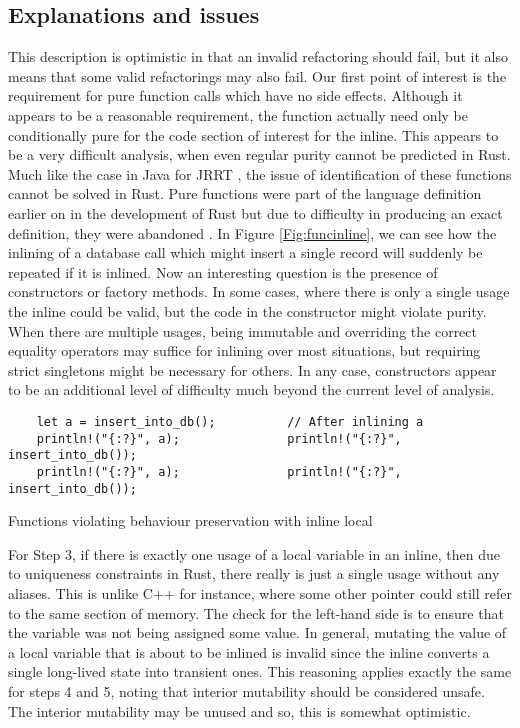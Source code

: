 \subsection{Explanations and issues}\label{S:inlineissues}
This description is optimistic in that an invalid refactoring should fail, but it also means that some valid refactorings may also fail. Our first point of interest is the requirement for pure function calls which have no side effects. Although it appears to be a reasonable requirement, the function actually need only be conditionally pure for the code section of interest for the inline. This appears to be a very difficult analysis, when even regular purity cannot be predicted in Rust. Much like the case in Java for JRRT \cite{schafer2010specification}, the issue of identification of these functions cannot be solved in Rust. Pure functions were part of the language definition earlier on in the development of Rust but due to difficulty in producing an exact definition, they were abandoned \cite{pwalton}. In Figure \ref{Fig:funcinline}, we can see how the inlining of a database call which might insert a single record will suddenly be repeated if it is inlined. Now an interesting question is the presence of constructors or factory methods. In some cases, where there is only a single usage the inline could be valid, but the code in the constructor might violate purity. When there are multiple usages, being immutable and overriding the correct equality operators may suffice for inlining over most situations, but requiring strict singletons might be necessary for others. In any case, constructors appear to be an additional level of difficulty much beyond the current level of analysis.

\begin{fig}[H]
\begin{verbatim}
    let a = insert_into_db();          // After inlining a
    println!("{:?}", a);               println!("{:?}", insert_into_db());
    println!("{:?}", a);               println!("{:?}", insert_into_db());
\end{verbatim}
\caption{Functions violating behaviour preservation with inline local}
\label{Fig:funcinline}
\end{fig}

For Step 3, if there is exactly one usage of a local variable in an inline, then due to uniqueness constraints in Rust, there really is just a single usage without any aliases. This is unlike C++ for instance, where some other pointer could still refer to the same section of memory. The check for the left-hand side is to ensure that the variable was not being assigned some value. In general, mutating the value of a local variable that is about to be inlined is invalid since the inline converts a single long-lived state into transient ones. This reasoning applies exactly the same for steps 4 and 5, noting that interior mutability should be considered unsafe. The interior mutability may be unused and so, this is somewhat optimistic.

